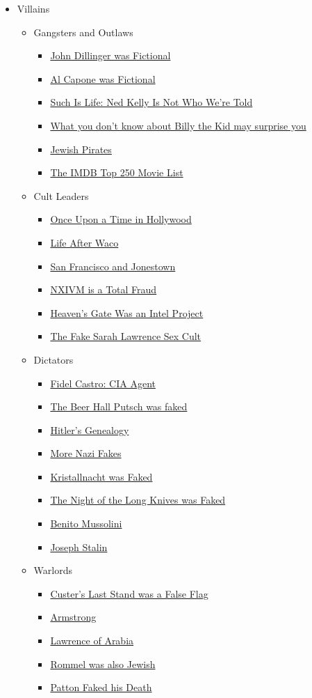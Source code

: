 \documentclass{article}
\newcommand{\insertmydocument}[2]{ %
  \item \href{http://www.mileswmathis.com/#2}{#1}
}
\begin{document}
\begin{itemize}
  \item Villains
  \begin{itemize}
    \item Gangsters and Outlaws
    \begin{itemize}
      \insertmydocument{John Dillinger was Fictional}{dilli2.pdf}
      \insertmydocument{Al Capone was Fictional}{capone.pdf}
      \insertmydocument{Such Is Life: Ned Kelly Is Not Who We’re Told}{kelly.pdf}
      \insertmydocument{What you don't know about Billy the Kid may surprise you}{billy.pdf}
      \insertmydocument{Jewish Pirates}{pirate.pdf}
      \insertmydocument{The IMDB Top 250 Movie List}{250.pdf}
    \end{itemize}
    \item Cult Leaders
    \begin{itemize}
      \insertmydocument{Once Upon a Time in Hollywood}{hollyw.pdf}
      \insertmydocument{Life After Waco}{waco.pdf}
      \insertmydocument{San Francisco and Jonestown}{jones.pdf}
      \insertmydocument{NXIVM is a Total Fraud}{nxivm.pdf}
      \insertmydocument{Heaven’s Gate Was an Intel Project}{hgate.pdf}
      \insertmydocument{The Fake Sarah Lawrence Sex Cult}{slsc.pdf}
    \end{itemize}
    \item Dictators
    \begin{itemize}

      \insertmydocument{Fidel Castro: CIA Agent}{castro.pdf}
      \insertmydocument{The Beer Hall Putsch was faked}{putsch.pdf}
      \insertmydocument{Hitler's Genealogy}{hiller.pdf}
      \insertmydocument{More Nazi Fakes}{siegel.pdf}
      \insertmydocument{Kristallnacht was Faked}{kristall.pdf}
      \insertmydocument{The Night of the Long Knives was Faked}{knives.pdf}
      \insertmydocument{Benito Mussolini}{benito.pdf}
      \insertmydocument{Joseph Stalin}{stalin.pdf}
    \end{itemize}

    \item Warlords
    \begin{itemize}

      \insertmydocument{Custer's Last Stand was a False Flag}{custer.pdf}
      \insertmydocument{Armstrong}{lance.pdf}
      \insertmydocument{Lawrence of Arabia}{arab.pdf}
      \insertmydocument{Rommel was also Jewish}{rommel.pdf}
      \insertmydocument{Patton Faked his Death}{patton.pdf}
    \end{itemize}


\end{itemize}
\end{itemize}
\end{document}

